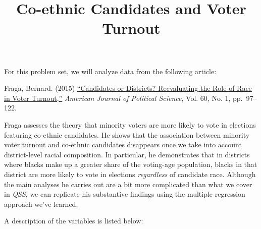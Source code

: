 \documentclass[]{article}
\title{Co-ethnic Candidates and Voter Turnout}
\author{}
\date{}
\begin{document}
\maketitle


For this problem set, we will analyze data from the following article:

Fraga, Bernard. (2015)
\href{http://dx.doi.org/10.1111/ajps.12172}{``Candidates or Districts?
Reevaluating the Role of Race in Voter Turnout,''} \emph{American
Journal of Political Science}, Vol. 60, No. 1, pp.~97--122.

Fraga assesses the theory that minority voters are more likely to vote
in elections featuring co-ethnic candidates. He shows that the
association between minority voter turnout and co-ethnic candidates
disappears once we take into account district-level racial composition.
In particular, he demonstrates that in districts where blacks make up a
greater share of the voting-age population, blacks in that district are
more likely to vote in elections \emph{regardless} of candidate race.
Although the main analyses he carries out are a bit more complicated
than what we cover in \emph{QSS}, we can replicate his substantive
findings using the multiple regression approach we've learned.

A description of the variables is listed below:
\end{document}
